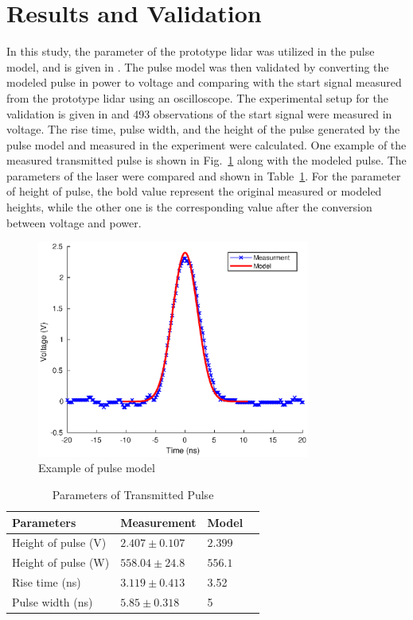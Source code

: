 \section{Results and Validation}
In this study, the parameter of the prototype lidar was utilized in the pulse model, and is given in . The pulse model was then validated by converting the modeled pulse in power to voltage and comparing with the start signal measured from the prototype lidar using an oscilloscope. The experimental setup for the validation is given in  and  493 observations of the start signal were measured in voltage. The rise time, pulse width, and the height of the pulse generated by the pulse model and measured in the experiment were calculated. One example of the measured transmitted pulse is shown in Fig.~\ref{fig:pulse} along with the modeled pulse. The parameters of the laser were compared and shown in Table~\ref{table:param_pulseModel}. For the parameter of height of pulse, the bold value represent the original measured or modeled heights, while the other one is the corresponding value after the conversion between voltage and power.
\begin{figure}[htbp] %
\centering
\graphicspath{ {figures/} }
\includegraphics[width=0.8\textwidth]{figures/chapter4_pulse/Fig_pulse_model_meas.eps}
\caption{Example of pulse model}
\label{fig:pulse}
\end{figure}

\begin{table}[htbp]
\caption{{Parameters of Transmitted Pulse}}
\centering
\label{table:param_pulseModel}
\begin{tabular}{|l|l|l|l|}
\hline
Parameters    & Measurement & Model\\ \hline
Height of pulse (V) & $\mathbf{2.407\pm 0.107}$ &  $2.399$             \\ \hline
Height of pulse (W) & $558.04\pm 24.8$ &  $\mathbf{556.1}$             \\ \hline
Rise time (ns) & $3.119\pm0.413$ &  3.52   \\ \hline
Pulse width (ns) & $5.85 \pm0.318$ &  5  \\ \hline
\end{tabular}%
\end{table}

